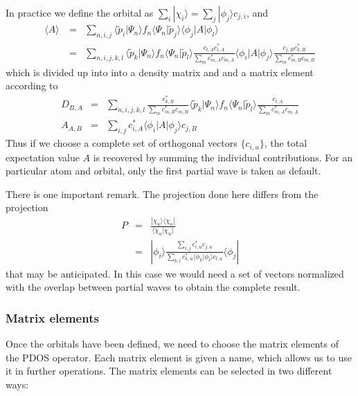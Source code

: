 \documentclass[final,12pt,makeidx,DIV=calc]{article}
\begin{document}
{{{{{{In practice we define the orbital as
$\sum_i|\chi_i\rangle=\sum_j|\phi_j\rangle c_{j,i}$, and
\begin{eqnarray*}
\langle A\rangle\
&=&\sum_{n,i,j}
\langle\tilde{p}_i|\Psi_n\rangle 
f_n\langle\Psi_n|\tilde{p}_j\rangle\langle\phi_j|A|\phi_l\rangle
\\
&=&\sum_{n,i,j,k,l}
\langle\tilde{p}_k|\Psi_n\rangle 
f_n\langle\Psi_n|\tilde{p}_l\rangle
\frac{c_{l,A}c^*_{i,A}}{\sum_m c^*_{m,A}c_{m,A}}
\langle\phi_i|A|\phi_j\rangle
\frac{c_{j,B}c^*_{k,B}}{\sum_m c^*_{m,B}c_{m,B}}
\end{eqnarray*}
which is divided up into into a density matrix and and a matrix
element according to
\begin{eqnarray*}
D_{B,A}&=&\sum_{n,i,j,k,l}
\frac{c^*_{k,B}}{\sum_m c^*_{m,B}c_{m,B}}
\langle\tilde{p}_k|\Psi_n\rangle 
f_n\langle\Psi_n|\tilde{p}_l\rangle
\frac{c_{l,A}}{\sum_m c^*_{m,A}c_{m,A}}
\\
A_{A,B}&=&\sum_{i,j}c^*_{i,A}\langle\phi_i|A|\phi_j\rangle c_{j,B}
\end{eqnarray*}
Thus if we choose a complete set of orthogonal vectors $\{c_{i,u}\}$,
the total expectation value $A$ is recovered by summing the individual
contributions. For an particular atom and orbital, only the first
partial wave is taken as default.

There is one important remark. The projection done here differs from
the projection 
\begin{eqnarray*}
P&=&\frac{|\chi_u\rangle\langle\chi_u|}{\langle\chi_u|\chi_u\rangle}
\\
&=&|\phi_i\rangle 
\frac{\sum_{i,j} c^*_{i,u}c_{j,u}}
{\sum_{k,l}c^*_{k,u}\langle\phi_k|\phi_l\rangle c_{l,u}}\langle\phi_j|
\end{eqnarray*}
that may be anticipated. In this case we would need a set of vectors
normalized with the overlap between partial waves to obtain the
complete result.


\subsubsection{Matrix elements}

Once the orbitals have been defined, we need to choose the matrix
elements of the PDOS operator. Each matrix element is given a name,
which allows us to use it in further operations. The matrix elements
can be selected in two different ways:

}}}}}}
\end{document}
